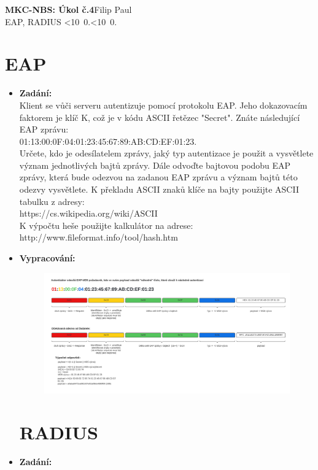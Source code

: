 \documentclass[10pt, a4paper]{article}%
\def\mydate{\leavevmode\hbox{\twodigits\day.\twodigits\month.\the\year}}
\def\twodigits#1{\ifnum#1<10 0\fi\the#1}
\begin{document}
\begin{flushleft}%
	\textbf{\Large{MKC-NBS: Úkol č.4}}\hfill Filip Paul\\
	\large{EAP, RADIUS \hfill\mydate}
\end{flushleft}
\section*{\large{\textbf{EAP}}}
	\begin{itemize}[label={}]
		\item \textbf{Zadání:}\\
		Klient se vůči serveru autentizuje pomocí protokolu EAP. Jeho dokazovacím faktorem je klíč K, což
		je v kódu ASCII řetězec "Secret". Znáte následující EAP zprávu:\\
		01:13:00:0F:04:01:23:45:67:89:AB:CD:EF:01:23.\\
		Určete, kdo je odesílatelem zprávy, jaký typ autentizace je použit a vysvětlete význam jednotlivých
		bajtů zprávy. Dále odvoďte bajtovou podobu EAP zprávy, která bude odezvou na zadanou EAP
		zprávu a význam bajtů této odezvy vysvětlete.
		K překladu ASCII znaků klíče na bajty použijte ASCII tabulku z adresy:\\
		https://cs.wikipedia.org/wiki/ASCII\\
		K výpočtu heše použijte kalkulátor na adrese:\\
		http://www.fileformat.info/tool/hash.htm\\
		
		
		\item \textbf{Vypracování:}\\
		\begin{figure}[ht!]
			\centering
			\includegraphics[width = 1\textwidth]{EAP.png}
			
		\end{figure}
		\section*{\large{\textbf{RADIUS}}}
		\item \textbf{Zadání:}\\
		

\end{itemize}
\end{document}
